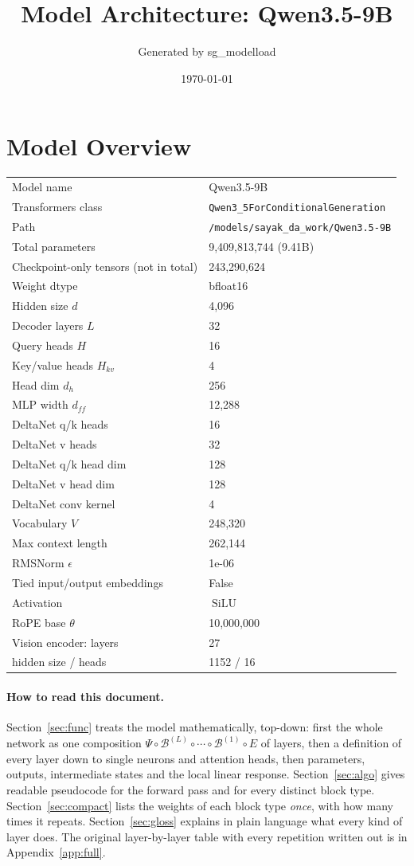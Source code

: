 \documentclass[10pt,a4paper]{article}
\title{Model Architecture: Qwen3.5-9B}
\author{Generated by sg\_modelload}
\date{\today}
\newcommand{\op}[1]{\operatorname{#1}}
\theoremstyle{definition}
\begin{document}
\maketitle
\tableofcontents
\clearpage
\section{Model Overview}
\begin{tabular}{ll}
\toprule
Model name & Qwen3.5-9B \\
Transformers class & \texttt{Qwen3\_5ForConditionalGeneration} \\
Path & \texttt{/models/sayak\_da\_work/Qwen3.\allowbreak{}5-9B} \\
Total parameters & 9,409,813,744 (9.41B) \\
Checkpoint-only tensors (not in total) & 243,290,624 \\
Weight dtype & bfloat16 \\
\midrule
Hidden size $d$ & 4,096 \\
Decoder layers $L$ & 32 \\
Query heads $H$ & 16 \\
Key/value heads $H_{kv}$ & 4 \\
Head dim $d_h$ & 256 \\
MLP width $d_{ff}$ & 12,288 \\
DeltaNet q/k heads & 16 \\
DeltaNet v heads & 32 \\
DeltaNet q/k head dim & 128 \\
DeltaNet v head dim & 128 \\
DeltaNet conv kernel & 4 \\
Vocabulary $V$ & 248,320 \\
Max context length & 262,144 \\
RMSNorm $\epsilon$ & 1e-06 \\
Tied input/output embeddings & False \\
Activation & $\op{SiLU}$ \\
RoPE base $\theta$ & 10,000,000 \\
\midrule
Vision encoder: layers & 27 \\
\quad hidden size / heads & 1152 / 16 \\
\bottomrule
\end{tabular}

\paragraph{How to read this document.} Section~\ref{sec:func} treats the model mathematically, top-down: first the whole network as one composition $\Psi\circ\mathcal{B}^{(L)}\circ\cdots\circ\mathcal{B}^{(1)}\circ E$ of layers, then a definition of every layer down to single neurons and attention heads, then parameters, outputs, intermediate states and the local linear response. Section~\ref{sec:algo} gives readable pseudocode for the forward pass and for every distinct block type. Section~\ref{sec:compact} lists the weights of each block type \emph{once}, with how many times it repeats. Section~\ref{sec:gloss} explains in plain language what every kind of layer does. The original layer-by-layer table with every repetition written out is in Appendix~\ref{app:full}.
\end{document}
